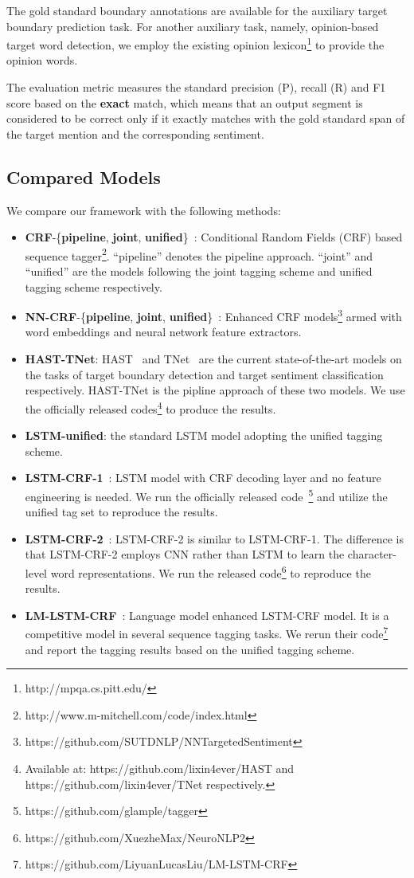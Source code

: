 \documentclass[letterpaper]{article} %
\begin{document}
The gold standard boundary annotations are available for the auxiliary target boundary prediction task. For another auxiliary task, namely, opinion-based target word detection, we employ the existing opinion lexicon\footnote{http://mpqa.cs.pitt.edu/} to provide the opinion words.

The evaluation metric measures the standard precision (P), recall (R) and F1 score based on the \textbf{exact} match, which means that an output segment is considered to be correct only if it exactly matches with the gold standard span of the target mention and the corresponding sentiment.

\subsection{Compared Models}
We compare our framework with the following methods:
\begin{itemize}
    \item \textbf{CRF}-\{\textbf{pipeline}, \textbf{joint}, \textbf{unified}\}~\cite{D13-1171}: Conditional Random Fields (CRF) based sequence tagger\footnote{http://www.m-mitchell.com/code/index.html}. ``pipeline'' denotes the pipeline approach. ``joint'' and ``unified'' are the models following the joint tagging scheme and unified tagging scheme respectively.
    \item \textbf{NN-CRF}-\{\textbf{pipeline}, \textbf{joint}, \textbf{unified}\}~\cite{D15-1073}: Enhanced CRF models\footnote{https://github.com/SUTDNLP/NNTargetedSentiment} armed with word embeddings and neural network feature extractors.
    \item \textbf{HAST-TNet}: HAST~\cite{li2018aspect} and TNet~\cite{P18-1087} are the current state-of-the-art models on the tasks of target boundary detection and target sentiment classification respectively. HAST-TNet is the pipline approach of these two models. We use the officially released codes\footnote{Available at: https://github.com/lixin4ever/HAST and  https://github.com/lixin4ever/TNet respectively.} to produce the results.
    \item \textbf{LSTM-unified}: the standard LSTM model adopting the unified tagging scheme.
    \item \textbf{LSTM-CRF-1}~\cite{N16-1030}: LSTM model with CRF decoding layer and no feature engineering is needed. We run the officially released code~\footnote{https://github.com/glample/tagger} and utilize the unified tag set to reproduce the results.
    \item \textbf{LSTM-CRF-2}~\cite{P16-1101}: LSTM-CRF-2 is similar to LSTM-CRF-1. The difference is that LSTM-CRF-2 employs CNN rather than LSTM to learn the character-level word representations. We run the released code\footnote{https://github.com/XuezheMax/NeuroNLP2} to reproduce the results.
    \item \textbf{LM-LSTM-CRF}~\cite{liu2017empower}: Language model enhanced LSTM-CRF model. It is a competitive model in several sequence tagging tasks. We rerun their code\footnote{https://github.com/LiyuanLucasLiu/LM-LSTM-CRF} and report the tagging results based on the unified tagging scheme.
\end{itemize}
\end{document}
